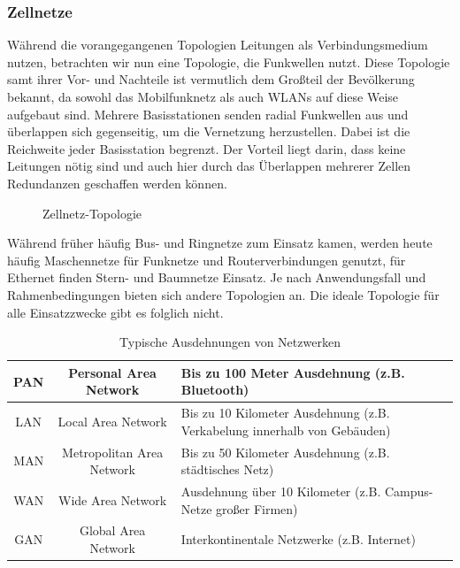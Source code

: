 \documentclass[11pt,a4paper]{scrartcl}
\begin{document}
\subsubsection{Zellnetze}
Während die vorangegangenen Topologien Leitungen als Verbindungsmedium nutzen, betrachten wir nun eine Topologie, die Funkwellen nutzt. Diese Topologie samt ihrer Vor- und Nachteile ist vermutlich dem Großteil der Bevölkerung bekannt, da sowohl das Mobilfunknetz als auch WLANs auf diese Weise aufgebaut sind. Mehrere Basisstationen senden radial Funkwellen aus und überlappen sich gegenseitig, um die Vernetzung herzustellen. Dabei ist die Reichweite jeder Basisstation begrenzt. Der Vorteil liegt darin, dass keine Leitungen nötig sind und auch hier durch das Überlappen mehrerer Zellen Redundanzen geschaffen werden können.
\begin{figure}[h]
\centering
{}
\caption{Zellnetz-Topologie}
\end{figure}
Während früher häufig Bus- und Ringnetze zum Einsatz kamen, werden heute häufig Maschennetze für Funknetze und Routerverbindungen genutzt, für Ethernet finden Stern- und Baumnetze Einsatz. Je nach Anwendungsfall und Rahmenbedingungen bieten sich andere Topologien an. Die {\glqq}ideale{\grqq} Topologie für alle Einsatzzwecke gibt es folglich nicht.
\begin{table}[h]
\centering
\begin{tabular}{|c|c|p{7cm}|}
\hline
PAN & Personal Area Network & Bis zu 100 Meter Ausdehnung (z.B. Bluetooth) \\
\hline
LAN & Local Area Network & Bis zu 10 Kilometer Ausdehnung (z.B. Verkabelung innerhalb von Gebäuden)  \\
\hline
MAN & Metropolitan Area Network & Bis zu 50 Kilometer Ausdehnung (z.B. städtisches Netz) \\
\hline
WAN & Wide Area Network & Ausdehnung über 10 Kilometer (z.B. Campus-Netze großer Firmen) \\
\hline
GAN & Global Area Network & Interkontinentale Netzwerke (z.B. Internet) \\
\hline
\end{tabular}
\caption{Typische Ausdehnungen von Netzwerken}
\end{table}
\end{document}
